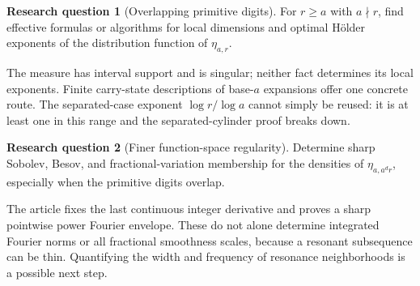 \documentclass[11pt,a4paper]{article}
\theoremstyle{definition}
\newtheorem{question}{Research question}
\theoremstyle{remark}
\begin{document}
\begin{question}[Overlapping primitive digits]
For $r\ge a$ with $a\nmid r$, find effective formulas or algorithms for
local dimensions and optimal H\"older exponents of the distribution
function of $\eta_{a,r}$.
\end{question}
The measure has interval support and is singular; neither fact determines
its local exponents. Finite carry-state descriptions of base-$a$
expansions offer one concrete route. The separated-case exponent
$\log r/\log a$ cannot simply be reused: it is at least one in this range
and the separated-cylinder proof breaks down.

\begin{question}[Finer function-space regularity]
Determine sharp Sobolev, Besov, and fractional-variation membership for the
densities of $\eta_{a,a^dr}$, especially when the primitive digits overlap.
\end{question}
The article fixes the last continuous integer derivative and proves a
sharp pointwise power Fourier envelope. These do not alone determine
integrated Fourier norms or all fractional smoothness scales, because a
resonant subsequence can be thin. Quantifying the width and frequency of
resonance neighborhoods is a possible next step.
\end{document}
